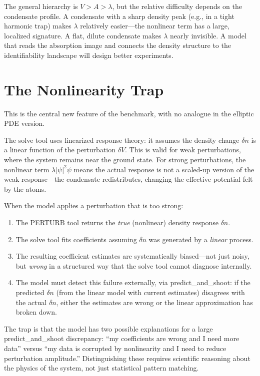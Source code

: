 \documentclass[11pt]{article}
\begin{document}
The general hierarchy is $V > A > \lambda$, but the relative difficulty depends on the condensate profile. A condensate with a sharp density peak (e.g., in a tight harmonic trap) makes $\lambda$ relatively easier---the nonlinear term has a large, localized signature. A flat, dilute condensate makes $\lambda$ nearly invisible. A model that reads the absorption image and connects the density structure to the identifiability landscape will design better experiments.

\section{The Nonlinearity Trap}

This is the central new feature of the benchmark, with no analogue in the elliptic PDE version.

The solve tool uses linearized response theory: it assumes the density change $\delta n$ is a linear function of the perturbation $\delta V$. This is valid for weak perturbations, where the system remains near the ground state. For strong perturbations, the nonlinear term $\lambda|\psi|^2\psi$ means the actual response is not a scaled-up version of the weak response---the condensate redistributes, changing the effective potential felt by the atoms.

When the model applies a perturbation that is too strong:
\begin{enumerate}[leftmargin=2em]
\item The PERTURB tool returns the \emph{true} (nonlinear) density response $\delta n$.
\item The solve tool fits coefficients assuming $\delta n$ was generated by a \emph{linear} process.
\item The resulting coefficient estimates are systematically biased---not just noisy, but \emph{wrong} in a structured way that the solve tool cannot diagnose internally.
\item The model must detect this failure externally, via predict\_and\_shoot: if the predicted $\delta n$ (from the linear model with current estimates) disagrees with the actual $\delta n$, either the estimates are wrong or the linear approximation has broken down.
\end{enumerate}

The trap is that the model has two possible explanations for a large predict\_and\_shoot discrepancy: ``my coefficients are wrong and I need more data'' versus ``my data is corrupted by nonlinearity and I need to reduce perturbation amplitude.'' Distinguishing these requires scientific reasoning about the physics of the system, not just statistical pattern matching.
\end{document}
